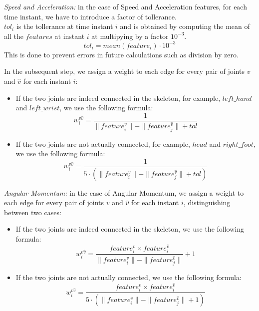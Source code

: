 \textit{Speed and Acceleration:} in the case of Speed and Acceleration features, for each time instant, we have to introduce a factor of tollerance.\\
$tol_i$ is the tollerance at time instant $i$ and is obtained by computing the mean of all the $features$ at instant $i$ at multipying by a factor 
$10^{-3}$.
\begin{equation}
  tol_i = mean(feature_i) \cdot 10^{-3}
  \label{formula:tol}
\end{equation}
This is done to prevent errors in future calculations such as division by zero.


In the subsequent step, we assign a weight to each edge for every pair of joints $v$ and $\hat{v}$ for each instant $i$:
\begin{itemize}
  \item If the two joints are indeed connected in the skeleton, for example, $left\_hand$ and $left\_wrist$, we use the following formula:
    \begin{equation}
      w^{v\hat{v}}_{i} = \frac{1}{\|feature^{v}_{i}\|-\|feature^{\hat{v}}_{j}\|+tol}
    \end{equation}
  \item If the two joints are not actually connected, for example, $head$ and $right\_foot$, we use the following formula:
    \begin{equation}
      w^{v\hat{v}}_{i} = \frac{1}{5 \cdot (\|feature^{v}_{i}\|-\|feature^{\hat{v}}_{j}\|+tol)}
      \label{formula:tol}
    \end{equation}
\end{itemize}

\textit{Angular Momentum:} in the case of Angular Momentum, we assign a weight to each edge for every pair of joints $v$ and $\hat{v}$ for
each instant $i$, distinguishing between two cases:
\begin{itemize}
  \item If the two joints are indeed connected in the skeleton, we use the following formula:
    \begin{equation}
      w^{v\hat{v}}_{i} = \frac{feature^{v}_{i} \times feature^{\hat{v}}_{i}}{\|feature^{v}_{i}\|-\|feature^{\hat{v}}_{j}\|} + 1
    \end{equation}
  \item If the two joints are not actually connected, we use the following formula:
    \begin{equation}
      w^{v\hat{v}}_{i} = \frac{feature^{v}_{i} \times feature^{\hat{v}}_{i}}{5 \cdot (\|feature^{v}_{i}\|-\|feature^{\hat{v}}_{j}\|+1)}
      \label{formula:tol}
    \end{equation}
\end{itemize}